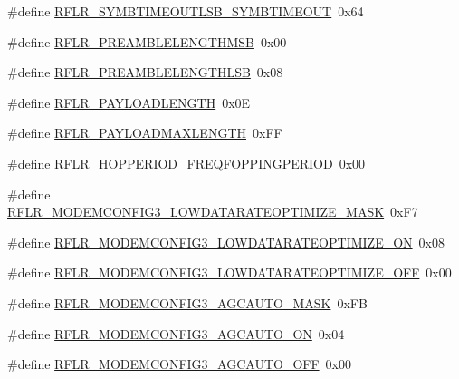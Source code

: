 \begin{DoxyCompactItemize}
\item 
\#define \hyperlink{sx1276Regs-LoRa_8h_a7c716a3e2f80da48b0d56525b7559fe2}{R\+F\+L\+R\+\_\+\+S\+Y\+M\+B\+T\+I\+M\+E\+O\+U\+T\+L\+S\+B\+\_\+\+S\+Y\+M\+B\+T\+I\+M\+E\+O\+UT}~0x64
\item 
\#define \hyperlink{sx1276Regs-LoRa_8h_a2cc4ec3c5fefaf4cb485fe1e2b02457a}{R\+F\+L\+R\+\_\+\+P\+R\+E\+A\+M\+B\+L\+E\+L\+E\+N\+G\+T\+H\+M\+SB}~0x00
\item 
\#define \hyperlink{sx1276Regs-LoRa_8h_a5da40c14ea4b9e74e51eaa3f889d7194}{R\+F\+L\+R\+\_\+\+P\+R\+E\+A\+M\+B\+L\+E\+L\+E\+N\+G\+T\+H\+L\+SB}~0x08
\item 
\#define \hyperlink{sx1276Regs-LoRa_8h_a0992f3f019223ffe14d03e6953678ede}{R\+F\+L\+R\+\_\+\+P\+A\+Y\+L\+O\+A\+D\+L\+E\+N\+G\+TH}~0x0E
\item 
\#define \hyperlink{sx1276Regs-LoRa_8h_ae2ef2578d9d578322e66d92d1a3d2b4f}{R\+F\+L\+R\+\_\+\+P\+A\+Y\+L\+O\+A\+D\+M\+A\+X\+L\+E\+N\+G\+TH}~0x\+FF
\item 
\#define \hyperlink{sx1276Regs-LoRa_8h_aedf4649ce9c41869658cdb3a9ea111af}{R\+F\+L\+R\+\_\+\+H\+O\+P\+P\+E\+R\+I\+O\+D\+\_\+\+F\+R\+E\+Q\+F\+O\+P\+P\+I\+N\+G\+P\+E\+R\+I\+OD}~0x00
\item 
\#define \hyperlink{sx1276Regs-LoRa_8h_acc0d112fd4a7d3bf0325e1e17701702c}{R\+F\+L\+R\+\_\+\+M\+O\+D\+E\+M\+C\+O\+N\+F\+I\+G3\+\_\+\+L\+O\+W\+D\+A\+T\+A\+R\+A\+T\+E\+O\+P\+T\+I\+M\+I\+Z\+E\+\_\+\+M\+A\+SK}~0x\+F7
\item 
\#define \hyperlink{sx1276Regs-LoRa_8h_a1def60d210d6a0ec8ea83f3137db0db3}{R\+F\+L\+R\+\_\+\+M\+O\+D\+E\+M\+C\+O\+N\+F\+I\+G3\+\_\+\+L\+O\+W\+D\+A\+T\+A\+R\+A\+T\+E\+O\+P\+T\+I\+M\+I\+Z\+E\+\_\+\+ON}~0x08
\item 
\#define \hyperlink{sx1276Regs-LoRa_8h_aba5ba3dcc0dca5012f459a1328e83e59}{R\+F\+L\+R\+\_\+\+M\+O\+D\+E\+M\+C\+O\+N\+F\+I\+G3\+\_\+\+L\+O\+W\+D\+A\+T\+A\+R\+A\+T\+E\+O\+P\+T\+I\+M\+I\+Z\+E\+\_\+\+O\+FF}~0x00
\item 
\#define \hyperlink{sx1276Regs-LoRa_8h_a7436ec112d8acb4c70d2ff02a0e0424c}{R\+F\+L\+R\+\_\+\+M\+O\+D\+E\+M\+C\+O\+N\+F\+I\+G3\+\_\+\+A\+G\+C\+A\+U\+T\+O\+\_\+\+M\+A\+SK}~0x\+FB
\item 
\#define \hyperlink{sx1276Regs-LoRa_8h_ac3e41f96acc26c049d2ba14aaf97173a}{R\+F\+L\+R\+\_\+\+M\+O\+D\+E\+M\+C\+O\+N\+F\+I\+G3\+\_\+\+A\+G\+C\+A\+U\+T\+O\+\_\+\+ON}~0x04
\item 
\#define \hyperlink{sx1276Regs-LoRa_8h_ab2d2c93d68a0a68d8b6dbdbf49590245}{R\+F\+L\+R\+\_\+\+M\+O\+D\+E\+M\+C\+O\+N\+F\+I\+G3\+\_\+\+A\+G\+C\+A\+U\+T\+O\+\_\+\+O\+FF}~0x00

\end{DoxyCompactItemize}
